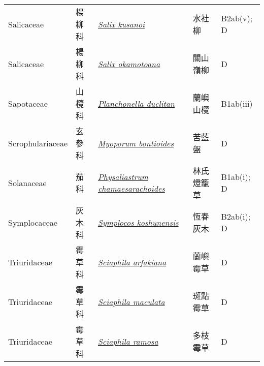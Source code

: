 {\begin{longtable}{L{2.5cm}L{2cm}L{5cm}L{2.5cm}L{3cm}}
    Salicaceae & 楊柳科 & \href{http://www.theplantlist.org/tpl1.1/search?q=Salix+kusanoi}{\textit{Salix kusanoi} } & 水社柳 & B2ab(v); D    \\
    Salicaceae & 楊柳科 & \href{http://www.theplantlist.org/tpl1.1/search?q=Salix+okamotoana}{\textit{Salix okamotoana} } & 關山嶺柳 & D    \\
    Sapotaceae & 山欖科 & \href{http://www.theplantlist.org/tpl1.1/search?q=Planchonella+duclitan}{\textit{Planchonella duclitan} } & 蘭嶼山欖 & B1ab(iii)    \\
    Scrophulariaceae & 玄參科 & \href{http://www.theplantlist.org/tpl1.1/search?q=Myoporum+bontioides}{\textit{Myoporum bontioides} } & 苦藍盤 & D    \\
    Solanaceae & 茄科 & \href{http://www.theplantlist.org/tpl1.1/search?q=Physaliastrum+chamaesarachoides}{\textit{Physaliastrum chamaesarachoides} } & 林氏燈籠草 & B1ab(i); D    \\
    Symplocaceae & 灰木科 & \href{http://www.theplantlist.org/tpl1.1/search?q=Symplocos+koshunensis}{\textit{Symplocos koshunensis} } & 恆春灰木 & B2ab(i); D    \\
    Triuridaceae & 霉草科 & \href{http://www.theplantlist.org/tpl1.1/search?q=Sciaphila+arfakiana}{\textit{Sciaphila arfakiana} } & 蘭嶼霉草 & D    \\
    Triuridaceae & 霉草科 & \href{http://www.theplantlist.org/tpl1.1/search?q=Sciaphila+maculata}{\textit{Sciaphila maculata} } & 斑點霉草 & D    \\
    Triuridaceae & 霉草科 & \href{http://www.theplantlist.org/tpl1.1/search?q=Sciaphila+ramosa}{\textit{Sciaphila ramosa} } & 多枝霉草 & D    \\

\end{longtable}}
